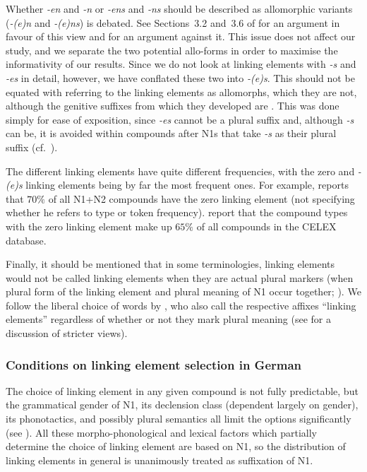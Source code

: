 Whether \textit{-en} and \textit{-n} or \textit{-ens} and \textit{-ns} should be described as allomorphic variants (\ie \textit{-(e)n} and \textit{-(e)ns}) is debated.
See Sections~3.2 and~3.6 of \textcite{NueblingSzczepaniak2013} for an argument in favour of this view and \textcite[33--36]{Neef2015} for an argument against it.
This issue does not affect our study, and we separate the two potential allo-forms in order to maximise the informativity of our results.
Since we do not look at linking elements with \textit{-s} and \textit{-es} in detail, however, we have conflated these two into \textit{-(e)s}.
This should not be equated with referring to the linking elements as allomorphs, which they are not, although the genitive suffixes from which they developed are \parencite[81]{Szczepaniak2016,NueblingSzczepaniak2013}.
This was done simply for ease of exposition, since \textit{-es} cannot be a plural suffix and, although \textit{-s} can be, it is avoided within compounds after N1s that take \textit{-s} as their plural suffix (cf.\ \citealt{Wegener2003,Wegener2005,NueblingSzczepaniak2013}).

The different linking elements have quite different frequencies, with the zero and \textit{-(e)s} linking elements being by far the most frequent ones.
For example, \textcite[177]{Gallmann1998} reports that $70\%$ of all N1+N2 compounds have the zero linking element (not specifying whether he refers to type or token frequency).
\textcite[29]{KrottEa2007} report that the compound types with the zero linking element make up $65\%$ of all compounds in the CELEX database.

Finally, it should be mentioned that in some terminologies, linking elements would not be called linking elements when they are actual plural markers (\ie when plural form of the linking element and plural meaning of N1 occur together; \citealt{Dressler1987}).
We follow the liberal choice of words by \textcite{BangaEa2013b}, who also call the respective affixes ``linking elements'' regardless of whether or not they mark plural meaning (see \citealt[196]{BangaEa2013b} for a discussion of stricter views).

\subsubsection{Conditions on linking element selection in German}
\label{sec:conditionsonlinkageselectioningerman}

The choice of linking element in any given compound is not fully predictable, but the grammatical gender of N1, its declension class (dependent largely on gender), its phonotactics, and possibly plural semantics all limit the options significantly (see \citealt{Fuhrhop1996,NueblingSzczepaniak2013}).
All these morpho-phono\-logical and lexical factors which partially determine the choice of linking element are based on N1, so the distribution of linking elements in general is unanimously treated as suffixation of N1.

